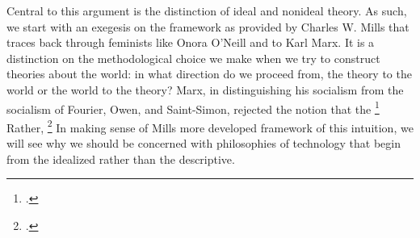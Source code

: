 \documentclass[letterpaper,notitlepage,12pt]{article}
\begin{document}


Central to this argument is the distinction of ideal and nonideal theory.
As such, we start with an exegesis on the framework as provided by Charles W.
Mills that traces back through feminists like Onora O'Neill and to Karl Marx.
It is a distinction on the methodological choice we make when we try to
construct theories about the world: in what direction do we proceed from, the 
theory to the world or the world to the theory?
Marx, in distinguishing his  socialism from the
 socialism of Fourier, Owen, and Saint-Simon, rejected the
notion that the \footcite{engels_socialism:_1978}
Rather, \footcite{marx_german_200}
In making sense of Mills more developed framework of this intuition, we will see
why we should be concerned with philosophies of technology that begin from the
idealized rather than the descriptive.
\end{document}
